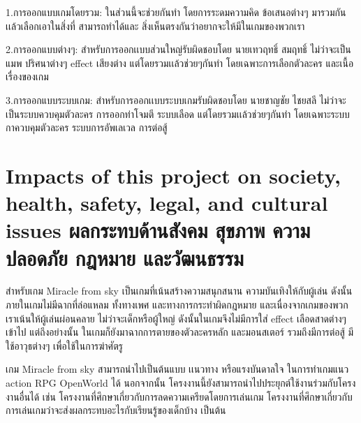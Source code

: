1.การออกแบบเกมโดยรวม: ในส่วนนี้จะช่วยกันทำ โดยการระดมความคิด ข้อเสนอต่างๆ มารวมกันเเล้วเลือกเอาในสิ่งที่ สามารถทำได้และ สิ่งเห็นตรงกันว่าอยากจะให้มีในเกมของพวกเรา

2.การออกแบบต่างๆ: สำหรับการออกเเบบส่วนใหญ่รับผิดชอบโดย นายเทวฤทธิ์ สมฤทธิ์ ไม่ว่าจะเป็น แมพ ปริศนาต่างๆ effect เสียงต่าง แต่โดยรวมเเล้วช่วยๆกันทำ โดยเฉพาะการเลือกตัวละคร และเนื้อเรื่องของเกม

3.การออกแบบระบบเกม: สำหรับการออกเเบบระบบเกมรับผิดชอบโดย นายชาญชัย ไชยสลี ไม่ว่าจะเป็นระบบควบคุมตัวละคร การออกท่าโจมตี ระบบเลือด แต่โดยรวมเเล้วช่วยๆกันทำ โดยเฉพาะระบบกาควบคุมตัวละคร ระบบการอัพเลเวล การต่อสู้

\section{\ifenglish%
Impacts of this project on society, health, safety, legal, and cultural issues
\else%
ผลกระทบด้านสังคม สุขภาพ ความปลอดภัย กฎหมาย และวัฒนธรรม
\fi}
\enskip \enskip \enskip \enskip \enskip สำหรับเกม Miracle from sky เป็นเกมที่เน้นสร้างความสนุกสนาน ความบันเทิงให้กับผู้เล่น ดังนั้นภายในเกมไม่มีฉากที่ล่อแหลม ทั้งทางเพศ และทางการกระทำผิดกฎหมาย และเนื่องจากเกมของพวกเราเน้นให้ผู้เล่นผ่อนคลาย ไม่ว่าจะเด็กหรือผู้ใหญ่ ดังนั้นในเกมจึงไม่มีการใส่ effect เลือดสาดต่างๆเข้าไป แต่ถึงอย่างนั้น 
ในเกมก็ยังมาฉากการตายของตัวละครหลัก และมอนสเตอร์ รวมถึงมีการต่อสู้ มีใช้อาวุธต่างๆ เพื่อใช้ในการฆ่าศัตรู

\enskip \enskip เกม Miracle from sky สามารถนำไปเป็นต้นแบบ เเนวทาง หรือแรงบันดาลใจ ในการทำเกมแนว action RPG OpenWorld ได้ นอกจากนั้น โครงงานนี้ยังสามารถนำไปประยุกต์ใช้งานร่วมกับโครงงานอื่นได้ เช่น โครงงานที่ศึกษาเกี่ยวกับการลดความเครียดโดยการเล่นเกม โครงงานที่ศึกษาเกี่ยวกับการเล่นเกมว่าจะส่งผลกระทบอะไรกับเรียนรู้ของเด็กบ้าง เป็นต้น


